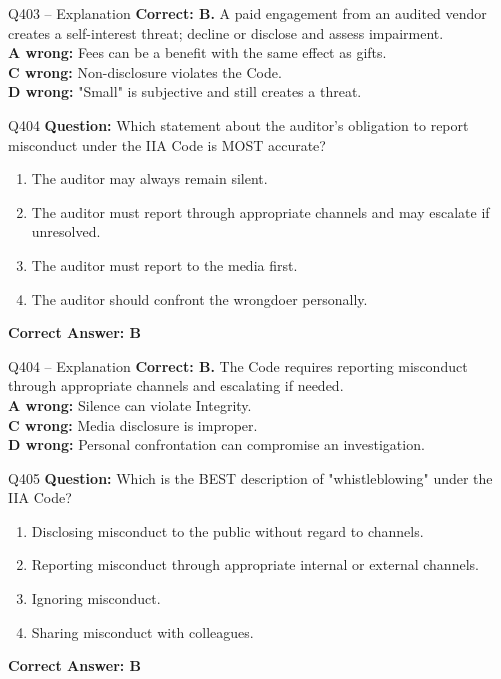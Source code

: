 \documentclass[aspectratio=169,10pt]{beamer}
\begin{document}
	\begin{frame}[t]{Q403 -- Explanation}
		\small
		\textbf{Correct: B.} A paid engagement from an audited vendor creates a self-interest threat; decline or disclose and assess impairment. \\[4pt]
		\textbf{A wrong:} Fees can be a benefit with the same effect as gifts. \\[2pt]
		\textbf{C wrong:} Non-disclosure violates the Code. \\[2pt]
		\textbf{D wrong:} "Small" is subjective and still creates a threat.
	\end{frame}
	
	\begin{frame}[t]{Q404}
		\small
		\textbf{Question:} Which statement about the auditor's obligation to report misconduct under the IIA Code is MOST accurate?
		\begin{enumerate}[label=\Alph*.,itemsep=1pt,topsep=2pt]
			\item The auditor may always remain silent.
			\item The auditor must report through appropriate channels and may escalate if unresolved.
			\item The auditor must report to the media first.
			\item The auditor should confront the wrongdoer personally.
		\end{enumerate}
		\vspace{4pt}
		\textbf{Correct Answer: B}
	\end{frame}
	
	\begin{frame}[t]{Q404 -- Explanation}
		\small
		\textbf{Correct: B.} The Code requires reporting misconduct through appropriate channels and escalating if needed. \\[4pt]
		\textbf{A wrong:} Silence can violate Integrity. \\[2pt]
		\textbf{C wrong:} Media disclosure is improper. \\[2pt]
		\textbf{D wrong:} Personal confrontation can compromise an investigation.
	\end{frame}
	
	\begin{frame}[t]{Q405}
		\small
		\textbf{Question:} Which is the BEST description of "whistleblowing" under the IIA Code?
		\begin{enumerate}[label=\Alph*.,itemsep=1pt,topsep=2pt]
			\item Disclosing misconduct to the public without regard to channels.
			\item Reporting misconduct through appropriate internal or external channels.
			\item Ignoring misconduct.
			\item Sharing misconduct with colleagues.
		\end{enumerate}
		\vspace{4pt}
		\textbf{Correct Answer: B}
	\end{frame}
	
\end{document}
